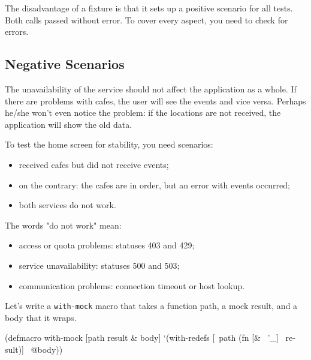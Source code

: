 \fi

The disadvantage of a fixture is that it sets up a positive scenario for all tests. Both calls passed without error. To cover every aspect, you need to check for errors.

\subsection{Negative Scenarios}


The unavailability of the service should not affect the application as a whole. If there are problems with cafes, the user will see the events and vice versa. Perhaps he/she won't even notice the problem: if the locations are not received, the application will show the old data.

To test the home screen for stability, you need scenarios:

\begin{itemize}

\item
  received cafes but did not receive events;

\item
  on the contrary: the cafes are in order, but an error with events occurred;

\item
  both services do not work.

\end{itemize}

The words "do not work" mean:


\begin{itemize}

\item
  access or quota problems: statuses 403 and 429;

\item
  service unavailability: statuses 500 and 503;

\item
  communication problems: connection timeout or host lookup.

\end{itemize}

Let's write a \verb|with-mock| macro that takes a function path, a mock result, and a body that it wraps.


\begin{english}
  \begin{clojure}
(defmacro with-mock
  [path result & body]
  `(with-redefs
     [~path (fn [& ~'_] ~result)]
     ~@body))
  \end{clojure}
\end{english}

